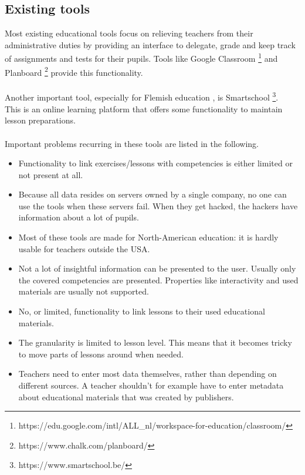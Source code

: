 \documentclass[12pt,journal]{IEEEtran}
\begin{document}
\subsection{Existing tools}
\label{subsection:existing-tools}
\noindent Most existing educational tools focus on relieving teachers from their administrative duties by providing an interface to delegate, grade and keep track of assignments and tests for their pupils.
Tools like Google Classroom \footnote{https://edu.google.com/intl/ALL\_nl/workspace-for-education/classroom/} and Planboard \footnote{https://www.chalk.com/planboard/} provide this functionality.\\ \\
Another important tool, especially for Flemish education \cite{destandaard}, is Smartschool \footnote{https://www.smartschool.be/}.\\
This is an online learning platform that offers some functionality to maintain lesson preparations.\\ \\
Important problems recurring in these tools are listed in the following.
\begin{itemize}
	\item Functionality to link exercises/lessons with competencies is either limited or not present at all.
 	\item Because all data resides on servers owned by a single company, no one can use the tools when these servers fail. When they get hacked, the hackers have information about a lot of pupils.
	\item Most of these tools are made for North-American education: it is hardly usable for teachers outside the USA.
 	\item Not a lot of insightful information can be presented to the user. Usually only the covered competencies are presented. Properties like interactivity and used materials are usually not supported.
  	\item No, or limited, functionality to link lessons to their used educational materials.
   	\item The granularity is limited to lesson level. This means that it becomes tricky to move parts of lessons around when needed.
    \item Teachers need to enter most data themselves, rather than depending on different sources. A teacher shouldn't for example have to enter metadata about educational materials that was created by publishers. 
\end{itemize}
\end{document}
